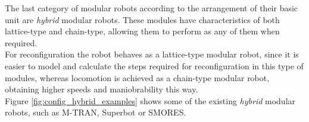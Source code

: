 The last category of modular robots according to the arrangement of their basic unit are \emph{hybrid} modular robots. These modules have characteristics of both lattice-type and chain-type, allowing them to perform as any of them when required.\\

For reconfiguration the robot behaves as a lattice-type modular robot, since it is easier to model and calculate the steps required for reconfiguration in this type of modules, whereas locomotion is achieved as a chain-type modular robot, obtaining higher speeds and maniobrability this way.\\

Figure \ref{fig:config_hybrid_examples} shows some of the existing \emph{hybrid} modular robots, such as M-TRAN, Superbot or SMORES.\\

